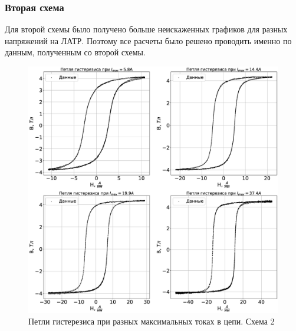 \documentclass[a4paper,14pt]{extarticle}
\begin{document}
			\subsubsection{Вторая схема}
				Для второй схемы было получено больше неискаженных графиков для разных напряжений на ЛАТР. Поэтому все расчеты было решено проводить именно по данным, полученным со второй схемы.
				\begin{figure}[h!]
					\centering
					\includegraphics[width=1.0\linewidth]{Lab2_3.eps}
					\caption{Петли гистерезиса при разных максимальных токах в цепи. Схема 2}
					\label{fig6}
				\end{figure}
				\newpage
\end{document}
